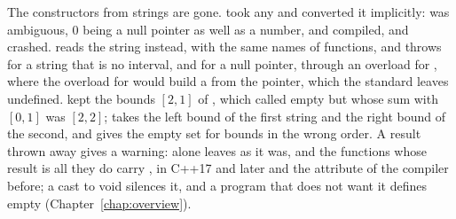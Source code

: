 \documentclass[12pt,a4paper,twoside,openright]{book}
\begin{document}
\medskip
The constructors from strings are gone.\newinvfive{}  took any  and converted it implicitly:
 was ambiguous, 0 being a null pointer as well as a number,
and  compiled, and crashed. 
reads the string instead, with the same names of functions, and throws
 for a string that is no interval, and for a
null pointer, through an overload for , where the overload
for  would build a  from the pointer,
which the standard leaves undefined.  kept the bounds $[2, 1]$ of , which
 called empty but whose sum with $[0, 1]$ was $[2, 2]$;
 takes the left bound of the first string
and the right bound of the second, and gives the empty set for bounds in the
wrong order. A result thrown away gives a warning:  alone
leaves  as it was, and the functions whose result is all they do
carry , \code{[[nodiscard]]} in C++17 and later and
the attribute of the compiler before; a cast to void silences it, and a
program that does not want it defines  empty
(Chapter~\ref{chap:overview}).
\end{document}
